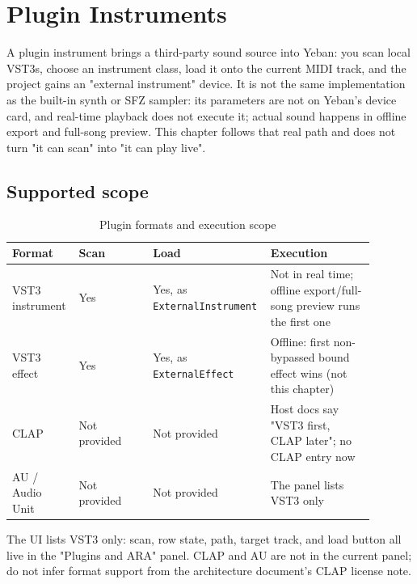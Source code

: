 \chapter{Plugin Instruments}
\label{chap:plugin-instruments}


A plugin instrument brings a third-party sound source into Yeban: you scan local VST3s, choose an instrument class, load it onto the current MIDI track, and the project gains an "external instrument" device. It is not the same implementation as the built-in synth or SFZ sampler: its parameters are not on Yeban's device card, and real-time playback does not execute it; actual sound happens in offline export and full-song preview. This chapter follows that real path and does not turn "it can scan" into "it can play live".

\section{Supported scope}

\begin{table}[htbp]
\centering
\small
\begin{tabular}{@{}p{0.16\linewidth}p{0.20\linewidth}p{0.25\linewidth}p{0.28\linewidth}@{}}
\hline
Format & Scan & Load & Execution \\
\hline
VST3 instrument & Yes & Yes, as \texttt{ExternalInstrument} & Not in real time; offline export/full-song preview runs the first one \\
VST3 effect & Yes & Yes, as \texttt{ExternalEffect} & Offline: first non-bypassed bound effect wins (not this chapter) \\
CLAP & Not provided & Not provided & Host docs say "VST3 first, CLAP later"; no CLAP entry now \\
AU / Audio Unit & Not provided & Not provided & The panel lists VST3 only \\
\hline
\end{tabular}
\caption{Plugin formats and execution scope}
\label{tab:plugin-formats}
\end{table}

The UI lists VST3 only: scan, row state, path, target track, and load button all live in the "Plugins and ARA" panel. CLAP and AU are not in the current panel; do not infer format support from the architecture document's CLAP license note.

